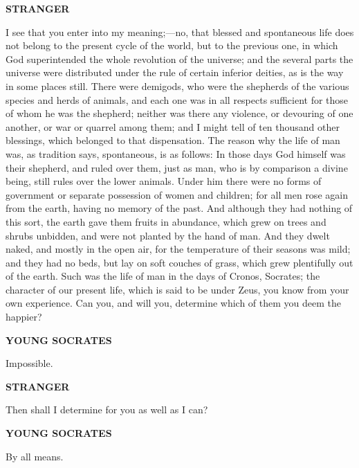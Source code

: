 \documentclass[11pt,letter]{article}
\begin{document}
\par \textbf{STRANGER}
\par   I see that you enter into my meaning;—no, that blessed and spontaneous life does not belong to the present cycle of the world, but to the previous one, in which God superintended the whole revolution of the universe; and the several parts the universe were distributed under the rule of certain inferior deities, as is the way in some places still. There were demigods, who were the shepherds of the various species and herds of animals, and each one was in all respects sufficient for those of whom he was the shepherd; neither was there any violence, or devouring of one another, or war or quarrel among them; and I might tell of ten thousand other blessings, which belonged to that dispensation. The reason why the life of man was, as tradition says, spontaneous, is as follows:  In those days God himself was their shepherd, and ruled over them, just as man, who is by comparison a divine being, still rules over the lower animals. Under him there were no forms of government or separate possession of women and children; for all men rose again from the earth, having no memory of the past. And although they had nothing of this sort, the earth gave them fruits in abundance, which grew on trees and shrubs unbidden, and were not planted by the hand of man. And they dwelt naked, and mostly in the open air, for the temperature of their seasons was mild; and they had no beds, but lay on soft couches of grass, which grew plentifully out of the earth. Such was the life of man in the days of Cronos, Socrates; the character of our present life, which is said to be under Zeus, you know from your own experience. Can you, and will you, determine which of them you deem the happier?

\par \textbf{YOUNG SOCRATES}
\par   Impossible.

\par \textbf{STRANGER}
\par   Then shall I determine for you as well as I can?

\par \textbf{YOUNG SOCRATES}
\par   By all means.
\end{document}
